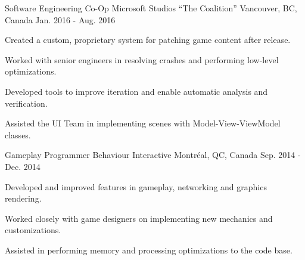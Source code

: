 \begin{cventries}
  \cventry
    {Software Engineering Co-Op} %
    {Microsoft Studios ``The Coalition''} %
    {Vancouver, BC, Canada} %
    {Jan. 2016 - Aug. 2016} %
    {
      \begin{cvitems} %
        \item {Created a custom, proprietary system for patching game content after release.}
        \item {Worked with senior engineers in resolving crashes and performing low-level optimizations.}
        \item {Developed tools to improve iteration and enable automatic analysis and verification.}
        \item {Assisted the UI Team in implementing scenes with Model-View-ViewModel classes.}
        \\
      \end{cvitems}
    }

  \cventry
    {Gameplay Programmer} %
    {Behaviour Interactive} %
    {Montréal, QC, Canada} %
    {Sep. 2014 - Dec. 2014} %
    {
      \begin{cvitems} %
        \item {Developed and improved features in gameplay, networking and graphics rendering.}
        \item {Worked closely with game designers on implementing new mechanics and customizations.}
        \item {Assisted in performing memory and processing optimizations to the code base.}
        \\
      \end{cvitems}
    }

\end{cventries}
